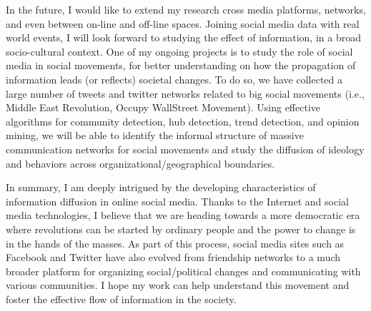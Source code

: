 \documentclass[phd,tocprelim]{cornell}
\begin{document}


In the future, I would like to extend my research cross media platforms, networks, and even between on-line and off-line spaces. Joining social media data with real world events, I will look forward to studying the effect of information, in a broad socio-cultural context. One of my ongoing projects is to study the role of social media in social movements, for better understanding on how the propagation of information leads (or reflects) societal changes. To do so, we have collected a large number of tweets and twitter networks related to big social movements (i.e., Middle East Revolution, Occupy WallStreet Movement). Using effective algorithms for community detection, hub detection, trend detection, and opinion
mining, we will be able to identify the informal structure of massive communication networks
for social movements and study the diffusion of ideology and behaviors across organizational/geographical boundaries.

In summary, I am deeply intrigued by the developing characteristics of information diffusion in online social media. Thanks to the Internet and social media technologies, I believe that we are heading towards a more democratic era where revolutions can be started by ordinary people and the power to change is in the hands of the masses. As part of this process, social media sites such as Facebook and Twitter have also evolved from friendship networks to a much broader platform for organizing social/political changes and communicating with various communities. I hope my work can help understand this movement and foster the effective flow of information in the society.




\end{document}
